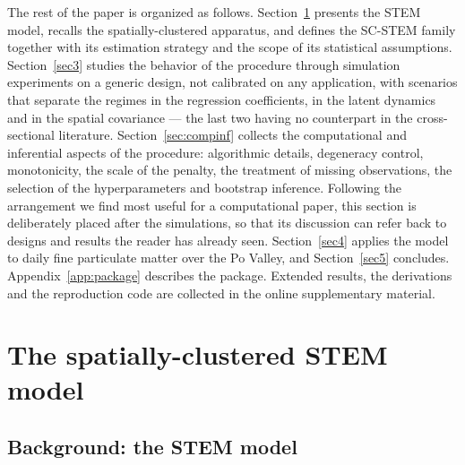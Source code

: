 The rest of the paper is organized as follows. Section~\ref{sec2} presents the STEM model, recalls the spatially-clustered apparatus, and defines the SC-STEM family together with its estimation strategy and the scope of its statistical assumptions. Section~\ref{sec3} studies the behavior of the procedure through simulation experiments on a generic design, not calibrated on any application, with scenarios that separate the regimes in the regression coefficients, in the latent dynamics and in the spatial covariance --- the last two having no counterpart in the cross-sectional literature. Section~\ref{sec:compinf} collects the computational and inferential aspects of the procedure: algorithmic details, degeneracy control, monotonicity, the scale of the penalty, the treatment of missing observations, the selection of the hyperparameters and bootstrap inference. Following the arrangement we find most useful for a computational paper, this section is deliberately placed after the simulations, so that its discussion can refer back to designs and results the reader has already seen. Section~\ref{sec4} applies the model to daily fine particulate matter over the Po Valley, and Section~\ref{sec5} concludes. Appendix~\ref{app:package} describes the \Stem{} package. Extended results, the derivations and the reproduction code are collected in the online supplementary material.

\section{The spatially-clustered STEM model}\label{sec2}

\subsection{Background: the STEM model}\label{sec2:stem}

